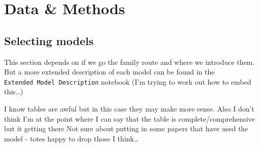 \documentclass[
  letterpaper,
  DIV=11,
  numbers=noendperiod]{scrartcl}
\begin{document}
\section{Data \& Methods}\label{sec-data-methods}

\subsection{Selecting models}\label{selecting-models}

This section depends on if we go the family route and where we introduce
them. But a more extended description of each model can be found in the
\texttt{Extended\ Model\ Description} notebook (I'm trying to work out
how to embed this\ldots)

I know tables are awful but in this case they may make more sense. Also
I don't think I'm at the point where I can say that the table is
complete/comprehensive but it getting there Not sure about putting in
some papers that have used the model - totes happy to drop those I
think\ldots{}
\end{document}

